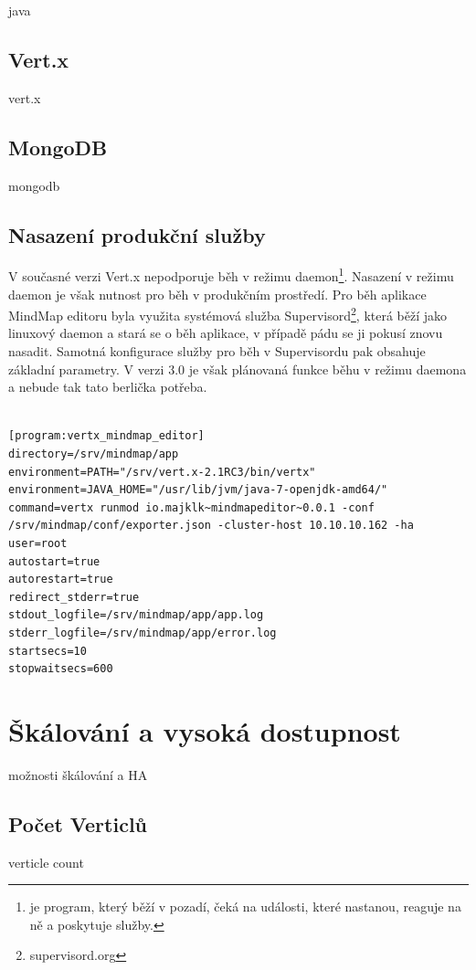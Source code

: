 java

\subsection{Vert.x}

vert.x

\subsection{MongoDB}

mongodb

\subsection{Nasazení produkční služby}

V současné verzi Vert.x nepodporuje běh v režimu daemon\footnote{je program, který běží v pozadí, čeká na události, které nastanou, reaguje na ně a poskytuje služby.}. Nasazení v režimu daemon je však nutnost pro běh v produkčním prostředí. Pro běh aplikace MindMap editoru byla využita systémová služba Supervisord\footnote{supervisord.org}, která běží jako linuxový daemon a stará se o běh aplikace, v případě pádu se ji pokusí znovu nasadit. Samotná konfigurace služby pro běh v Supervisordu pak obsahuje základní parametry. V verzi 3.0 je však plánovaná funkce běhu v režimu daemona a nebude tak tato berlička potřeba.

\begin{lstlisting}

[program:vertx_mindmap_editor]
directory=/srv/mindmap/app
environment=PATH="/srv/vert.x-2.1RC3/bin/vertx"
environment=JAVA_HOME="/usr/lib/jvm/java-7-openjdk-amd64/"
command=vertx runmod io.majklk~mindmapeditor~0.0.1 -conf /srv/mindmap/conf/exporter.json -cluster-host 10.10.10.162 -ha
user=root
autostart=true
autorestart=true
redirect_stderr=true
stdout_logfile=/srv/mindmap/app/app.log
stderr_logfile=/srv/mindmap/app/error.log
startsecs=10
stopwaitsecs=600

\end{lstlisting}


\section{Škálování a vysoká dostupnost}\label{sub:Scaling}

možnosti škálování a HA

\subsection{Počet Verticlů}
verticle count

